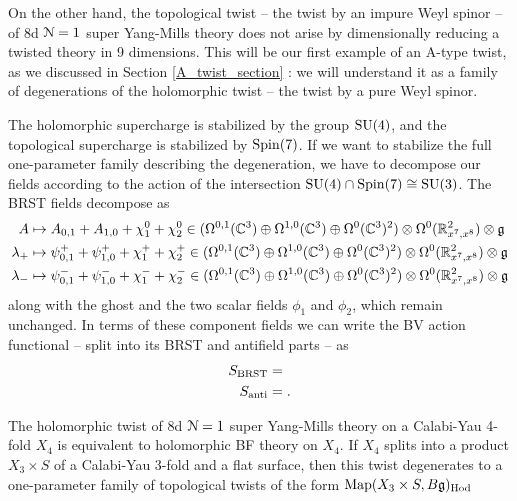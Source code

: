 \documentclass[10pt, oneside]{article}
\begin{document}
On the other hand, the topological twist -- the twist by an impure Weyl spinor -- of 8d $\mathcal{N}=1$ super Yang-Mills theory does not arise by dimensionally reducing a twisted theory in 9 dimensions.  This will be our first example of an A-type twist, as we discussed in Section \ref{A_twist_section} : we will understand it as a family of degenerations of the holomorphic twist -- the twist by a pure Weyl spinor.

The holomorphic supercharge is stabilized by the group $\mathrm{SU}(4)$, and the topological supercharge is stabilized by $\mathrm{Spin}(7)$.  If we want to stabilize the full one-parameter family describing the degeneration, we have to decompose our fields according to the action of the intersection $\mathrm{SU}(4) \cap \mathrm{Spin}(7) \cong \mathrm{SU}(3)$.  The BRST fields decompose as
\begin{align*}
A &\mapsto A_{0,1} + A_{1,0} + \chi^0_1 + \chi^0_2 \in (\Omega^{0,1}(\mathbb C^3) \oplus \Omega^{1,0}(\mathbb C^3) \oplus \Omega^0(\mathbb C^3)^2) \otimes \Omega^0(\mathbb R^2_{x^7,x^8}) \otimes \mathfrak{g}\\
\lambda_+ &\mapsto \psi^+_{0,1} + \psi^+_{1,0} + \chi^+_1 + \chi^+_2 \in (\Omega^{0,1}(\mathbb C^3) \oplus \Omega^{1,0}(\mathbb C^3) \oplus \Omega^0(\mathbb C^3)^2) \otimes \Omega^0(\mathbb R^2_{x^7,x^8}) \otimes \mathfrak{g}\\
\lambda_- &\mapsto \psi^-_{0,1} + \psi^-_{1,0} + \chi^-_1 + \chi^-_2 \in (\Omega^{0,1}(\mathbb C^3) \oplus \Omega^{1,0}(\mathbb C^3) \oplus \Omega^0(\mathbb C^3)^2) \otimes \Omega^0(\mathbb R^2_{x^7,x^8}) \otimes \mathfrak{g}
\end{align*}
along with the ghost and the two scalar fields $\phi_1$ and $\phi_2$, which remain unchanged.  In terms of these component fields we can write the BV action functional -- split into its BRST and antifield parts -- as
\begin{align*}
S_{\mathrm{BRST}} &= \\ 
S_{\mathrm{anti}} &= .
\end{align*}


\begin{theorem} \label{8d_holo_twist_thm}
The holomorphic twist of 8d $\mathcal{N}=1$ super Yang-Mills theory on a Calabi-Yau 4-fold $X_4$ is equivalent to holomorphic BF theory on $X_4$. If $X_4$ splits into a product $X_3 \times S$ of a Calabi-Yau 3-fold and a flat surface, then this twist degenerates to a one-parameter family of topological twists of the form $\operatorname{Map}(X_3 \times S, B\mathfrak{g})_{\mathrm{Hod}}$
\end{theorem}
\end{document}
